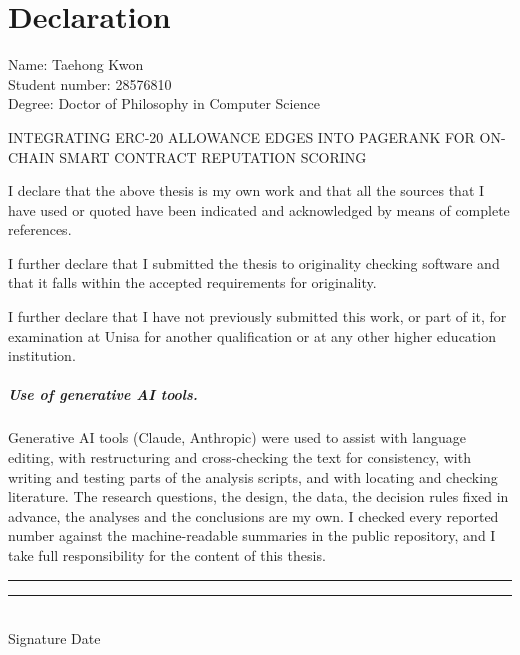 
\clearpage
{}
\chapter*{Declaration}
\label{ch:declaration}

\noindent Name: Taehong Kwon\\
Student number: 28576810\\
Degree: Doctor of Philosophy in Computer Science

\medskip
\noindent INTEGRATING ERC-20 ALLOWANCE EDGES INTO PAGERANK FOR ON-CHAIN SMART CONTRACT REPUTATION SCORING

\medskip
I declare that the above thesis is my own work and that all the sources that I have used or quoted have been indicated and acknowledged by means of complete references.

I further declare that I submitted the thesis to originality checking software and that it falls within the accepted requirements for originality.

I further declare that I have not previously submitted this work, or part of it, for examination at Unisa for another qualification or at any other higher education institution.

\paragraph{Use of generative AI tools.} Generative AI tools (Claude, Anthropic) were used to assist with language editing, with restructuring and cross-checking the text for consistency, with writing and testing parts of the analysis scripts, and with locating and checking literature. The research questions, the design, the data, the decision rules fixed in advance, the analyses and the conclusions are my own. I checked every reported number against the machine-readable summaries in the public repository, and I take full responsibility for the content of this thesis.


\vspace{2em}
\noindent\rule{6cm}{0.4pt}\hfill\rule{4cm}{0.4pt}\\
Signature \hfill Date
